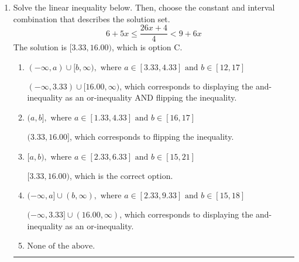 \documentclass{extbook}[14pt]
\newcommand{\litem}[1]{\item #1

\rule{\textwidth}{0.4pt}}
\begin{document}
\begin{enumerate}
{\begin{enumerate}[label=\Alph*.]
$[1.11, -4.60)$, which is the correct interval but negatives of the actual endpoints.
\item \( (a, b], \text{ where } a \in [0.11, 6.11] \text{ and } b \in [-4.6, -2.6] \)

$(1.11, -4.60]$, which corresponds to flipping the inequality and getting negatives of the actual endpoints.
\item \( (-\infty, a] \cup (b, \infty), \text{ where } a \in [0.11, 7.11] \text{ and } b \in [-4.6, -3.6] \)

$(-\infty, 1.11] \cup (-4.60, \infty)$, which corresponds to displaying the and-inequality as an or-inequality and getting negatives of the actual endpoints.
\item \( \text{None of the above.} \)

* This is correct as the answer should be $[-1.11, 4.60)$.
\end{enumerate}

\textbf{General Comment:} To solve, you will need to break up the compound inequality into two inequalities. Be sure to keep track of the inequality! It may be best to draw a number line and graph your solution.
}
\litem{
Solve the linear inequality below. Then, choose the constant and interval combination that describes the solution set.
\[ 6 + 5 x \leq \frac{26 x + 4}{4} < 9 + 6 x \]
The solution is \( [3.33, 16.00) \), which is option C.\begin{enumerate}[label=\Alph*.]
\item \( (-\infty, a) \cup [b, \infty), \text{ where } a \in [3.33, 4.33] \text{ and } b \in [12, 17] \)

$(-\infty, 3.33) \cup [16.00, \infty)$, which corresponds to displaying the and-inequality as an or-inequality AND flipping the inequality.
\item \( (a, b], \text{ where } a \in [1.33, 4.33] \text{ and } b \in [16, 17] \)

$(3.33, 16.00]$, which corresponds to flipping the inequality.
\item \( [a, b), \text{ where } a \in [2.33, 6.33] \text{ and } b \in [15, 21] \)

$[3.33, 16.00)$, which is the correct option.
\item \( (-\infty, a] \cup (b, \infty), \text{ where } a \in [2.33, 9.33] \text{ and } b \in [15, 18] \)

$(-\infty, 3.33] \cup (16.00, \infty)$, which corresponds to displaying the and-inequality as an or-inequality.
\item \( \text{None of the above.} \)



\end{enumerate}}
\end{enumerate}
\end{document}
